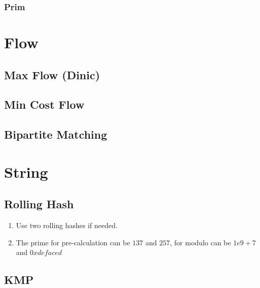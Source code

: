 \documentclass[10pt,oneside]{article}
\begin{document}
\begin{landscape}
\begin{multicols}{2}
\subsubsection{Prim}

\section{Flow}

\subsection{Max Flow (Dinic)}

\subsection{Min Cost Flow}

\subsection{Bipartite Matching}


\section{String}

\subsection{Rolling Hash}

\begin{enumerate}
	\item Use two rolling hashes if needed.  
	\item The prime for pre-calculation can be $137$ and $257$, for modulo can be $1e9 + 7$ and $0xdefaced$ 
\end{enumerate}


\subsection{KMP}


\end{multicols}
\end{landscape}
\end{document}
